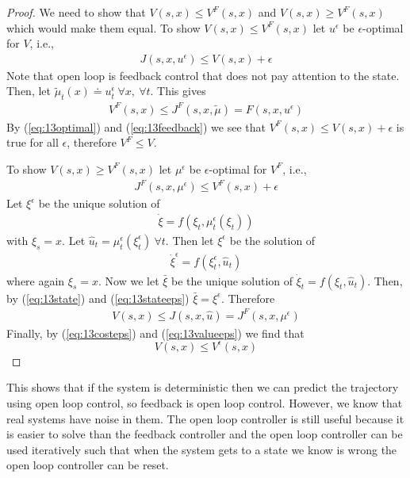 \begin{proof}
We need to show that $V(s,x)\leq V^F(s,x)$ and $V(s,x)\geq V^F(s,x)$ which would make them equal.
  To show $V(s,x)\leq V^F(s,x)$ let $u^\epsilon$  be $\epsilon$-optimal for $V$, i.e.,
\begin{align}
\label{eq:13optimal}
J(s,x,u^\epsilon) \leq V(s,x) + \epsilon
\end{align}
Note that open loop is feedback control that does not pay attention to the state.
Then, let $\tilde{\mu}_t(x) \doteq u_t^\epsilon~\forall x,~\forall t$.
This gives
\begin{align}
\label{eq:13feedback}
V^F(s,x) \leq J^F(s,x,\tilde{\mu}) = F(s,x,u^\epsilon)
\end{align}
By (\ref{eq:13optimal}) and (\ref{eq:13feedback}) we see that $V^F(s,x)\leq V(s,x)+\epsilon$ is true for all $\epsilon$, therefore $V^F\leq V$.

To show $V(s,x)\geq V^F(s,x)$ let $\mu^\epsilon$ be $\epsilon$-optimal for $V^F$, i.e.,
\begin{align}
\label{eq:13costeps}
J^F(s,x,\mu^\epsilon)\leq V^F(s,x) + \epsilon
\end{align}
Let $\xi^\epsilon$ be the unique solution of
\begin{align}
\label{eq:13state}
\dot{\xi}=f(\xi_t,\mu_t^\epsilon(\xi_t))
\end{align}
with $\xi_s=x$.
Let $\hat{u}_t=\mu_t^\epsilon(\xi_t^\epsilon)~\forall t$.
Then let $\xi^\epsilon$ be the solution of
\begin{align}
\label{eq:13stateeps}
\dot{\xi}^\epsilon = f(\xi_t^\epsilon,\hat{u}_t)
\end{align}
where again $\xi_s=x$.
Now we let $\bar{\xi}$ be the unique solution of $\dot{\xi}_t=f(\xi_t,\hat{u}_t)$.
Then, by (\ref{eq:13state}) and (\ref{eq:13stateeps}) $\bar{\xi}=\xi^\epsilon$.
Therefore
\begin{align}
\label{eq:13valueeps}
V(s,x) \leq J(s,x,\hat{u}) = J^F(s,x,\mu^\epsilon)
\end{align}
Finally, by (\ref{eq:13costeps}) and (\ref{eq:13valueeps}) we find that
$$V(s,x) \leq V^\epsilon(s,x)$$
\end{proof}

This shows that if the system is deterministic then we can predict the trajectory using open loop control, so feedback is open loop control.
However, we know that real systems have noise in them.
The open loop controller is still useful because it is easier to solve than the feedback controller and the open loop controller can be used iteratively such that when the system gets to a state we know is wrong the open loop controller can be reset.

